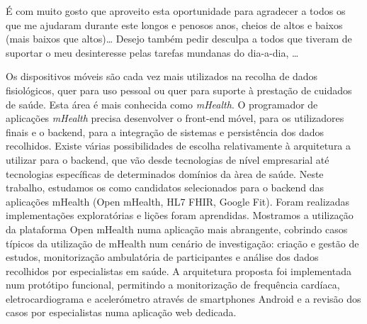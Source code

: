 \documentclass[11pt,twoside,a4paper]{report}
\begin{document}
\TitlePage
  \vspace*{55mm}
       {\'E com muito gosto que aproveito esta oportunidade para agradecer a todos os que me
        ajudaram durante este longos e penosos anos, cheios de altos e baixos (mais baixos que
        altos)\ldots}
  \TEXT{}
       {Desejo tamb\'em pedir desculpa a todos que tiveram de suportar o meu desinteresse pelas
        tarefas mundanas do dia-a-dia, \ldots}
\EndTitlePage
\titlepage\ \endtitlepage %

\TitlePage
  \vspace*{55mm}
       {Os dispositivos móveis são cada vez mais utilizados na recolha de dados fisiológicos, quer para uso pessoal ou quer para suporte à prestação de cuidados de saúde. Esta área é mais conhecida como \textit{mHealth}. O programador de aplicações \textit{mHealth} precisa desenvolver o front-end móvel, para os utilizadores finais e o backend, para a integração de sistemas e persistência dos dados recolhidos. Existe várias possibilidades de escolha relativamente à arquitetura a utilizar para o backend, que vão desde tecnologias de nível empresarial até tecnologias específicas de determinados domínios da àrea de saúde. Neste trabalho, estudamos os como candidatos selecionados para o backend das aplicações mHealth (Open mHealth, HL7 FHIR, Google Fit). Foram realizadas implementações exploratórias e lições foram aprendidas.}
    \TEXT{}
       {Mostramos a utilização da plataforma Open mHealth numa aplicação mais abrangente, cobrindo casos típicos da utilização de mHealth num cenário de investigação: criação e gestão de estudos, monitorização ambulatória de participantes e análise dos dados recolhidos por especialistas em saúde. A arquitetura proposta foi implementada num protótipo funcional, permitindo a monitorização de frequência cardíaca, eletrocardiograma e acelerómetro através de smartphones Android e a revisão dos casos por especialistas numa aplicação web dedicada.   
       }
\EndTitlePage
\titlepage\ \endtitlepage %
\end{document}
